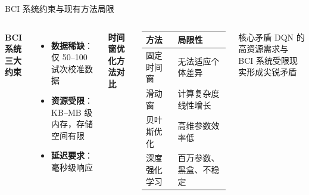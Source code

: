 \begin{frame}{BCI 系统约束与现有方法局限}
    \begin{columns}[T]
        \textbf{BCI 系统三大约束}
        
        \vspace{0.2cm}
        \begin{itemize}
            \item \textbf{数据稀缺}\cite{lotte2007review}：仅 50--100 试次校准数据
            \item \textbf{资源受限}：KB--MB 级内存，存储空间有限
            \item \textbf{延迟要求}：毫秒级响应
        \end{itemize}

        \textbf{时间窗优化方法对比}\cite{mcfarland1997spatial,yang2015time,chen2019dynamic,zhang2021mars}
        \renewcommand{\arraystretch}{1.2}
        \scriptsize
        \begin{tabular}{l|p{3.8cm}}
            \hline
            \textbf{方法} & \textbf{局限性} \\
            \hline
            固定时间窗 & 无法适应个体差异 \\
            滑动窗 & 计算复杂度线性增长 \\
            贝叶斯优化 & 高维参数效率低 \\
            深度强化学习 & 百万参数、黑盒、不稳定 \\
            \hline
        \end{tabular}
        
        \vspace{0.3cm}
        \begin{alertblock}{核心矛盾}
            \footnotesize
            DQN 的高资源需求与 BCI 系统受限现实形成尖锐矛盾\cite{mnih2015human}
        \end{alertblock}
    \end{columns}
\end{frame}

